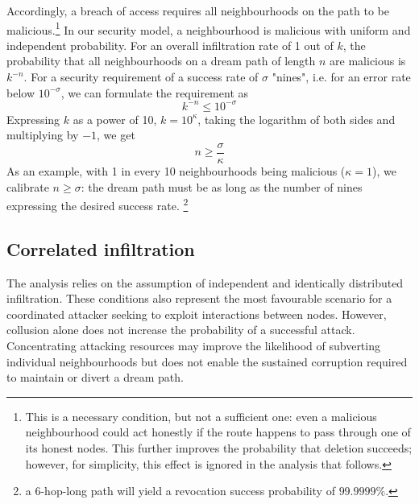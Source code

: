 \documentclass[singlecolumn]{acmart}
\begin{document}
Accordingly, a breach of access requires all neighbourhoods on the path to be malicious.\footnote{This is a necessary condition, but not a sufficient one: even a malicious neighbourhood could act honestly if the route happens to pass through one of its honest nodes. This further improves the probability that deletion succeeds; however, for simplicity, this effect is ignored in the analysis that follows. }
In our security model, a neighbourhood is malicious with uniform and independent probability. For an overall infiltration rate of 1 out of $k$, the probability that all neighbourhoods on a dream path of length $n$ are malicious is $k^{-n}$. For a security requirement of a success rate of $\sigma$ "nines", i.e. for an error rate below $10^{-\sigma}$, we can formulate the requirement as
\begin{equation}
k^{-n}\leq10^{-\sigma}
\end{equation}
Expressing $k$ as a power of 10, $k=10^\kappa$, taking the logarithm of both sides and multiplying by $-1$, we get
\begin{equation}
    n \geq \frac{\sigma}{\kappa}
\end{equation}
As an example, with 1 in every 10 neighbourhoods being malicious ($\kappa=1$), we calibrate $n\geq\sigma$: the dream path must be as long as the number of nines expressing the desired success rate.%
%
\footnote{a 6-hop-long path will yield a revocation success probability of $99.9999\%$.}

\subsection{Correlated infiltration}

The analysis relies on the assumption of independent and identically distributed infiltration. These conditions also represent the most favourable scenario for a coordinated attacker seeking to exploit interactions between nodes. However, collusion alone does not increase the probability of a successful attack. Concentrating attacking resources may improve the likelihood of subverting individual neighbourhoods but does not enable the sustained corruption required to maintain or divert a dream path.
\end{document}

